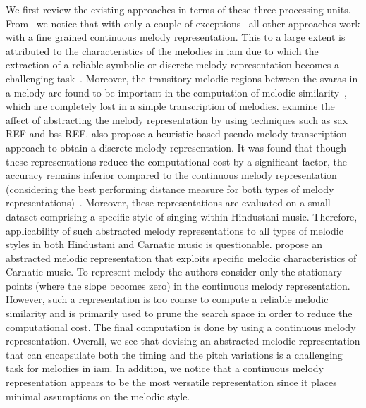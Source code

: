 {We first review the existing approaches in terms of these three processing units. From~ we notice that with only a couple of exceptions~\citep{Ross2012b,ganguli2015efficient} all other approaches work with a fine grained continuous melody representation. This to a large extent is attributed to the characteristics of the melodies in \gls{iam} due to which the extraction of a reliable symbolic or discrete melody representation becomes a challenging task~. Moreover, the transitory melodic regions between the \glspl{svara} in a melody are found to be important in the computation of melodic similarity~, which are completely lost in a simple transcription of melodies. \cite{Ross2012b,ganguli2015efficient} examine the affect of abstracting the melody representation by using techniques such as \gls{sax} REF and \gls{bss} REF. \cite{ganguli2015efficient} also propose a heuristic-based pseudo melody transcription approach to obtain a discrete melody representation. It was found that though these representations reduce the computational cost by a significant factor, the accuracy remains inferior compared to the continuous melody representation (considering the best performing distance measure for both types of melody representations)~\cite{Ross2012b,ganguli2015efficient}. Moreover, these representations are evaluated on a small dataset comprising a specific style of singing within Hindustani music. Therefore, applicability of such abstracted melody representations to all types of melodic styles in both Hindustani and Carnatic music is questionable. \cite{Ishwar2013,Dutta2014,dutta2014modified} propose an abstracted melodic representation that exploits specific melodic characteristics of Carnatic music. To represent melody the authors consider only the stationary points (where the slope becomes zero) in the continuous melody representation. However, such a representation is too coarse to compute a reliable melodic similarity and is primarily used to prune the search space in order to reduce the computational cost. The final computation is done by using a continuous melody representation. Overall, we see that devising an abstracted melodic representation that can encapsulate both the timing and the pitch variations is a challenging task for melodies in \gls{iam}. In addition, we notice that a continuous melody representation appears to be the most versatile representation since it places minimal assumptions on the melodic style. 

}
